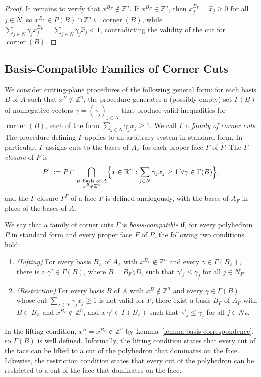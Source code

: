 \documentclass{article}
\newcommand{\Z}{\mathbb{Z}}
\newcommand{\R}{\mathbb{R}}
\begin{document}
\begin{proof}
    It remains to verify that $x^{B_F} \notin \Z^n$. If $x^{B_F} \in \Z^n$, then $x^{B_F}_j = \hat x_j \geq 0$ for all $j \in N$, so $x^{B_F} \in P(B) \cap \Z^n \subseteq \operatorname{corner}(B)$, while $\sum_{j \in N} \gamma_j x^{B_F}_j = \sum_{j \in N} \gamma_j \hat x_j < 1$, contradicting the validity of the cut for $\operatorname{corner}(B)$.
\end{proof}

\subsection{Basis-Compatible Families of Corner Cuts} \label{subsec:corner-hered}

We consider cutting-plane procedures of the following general form: for each basis $B$ of $A$ such that $x^B \notin \Z^n$, the procedure generates a (possibly empty) set $\Gamma(B)$ of nonnegative vectors $\gamma = (\gamma_j)_{j \in N}$ that produce valid inequalities for $\operatorname{corner}(B)$, each of the form $\sum_{j \in N} \gamma_j x_j \geq 1$. We call $\Gamma$ a \emph{family of corner cuts}. The procedure defining $\Gamma$ applies to an arbitrary system in standard form. In particular, $\Gamma$ assigns cuts to the bases of $A_F$ for each proper face $F$ of $P$. The \emph{$\Gamma$-closure} of $P$ is
\begin{align}
    P^\Gamma := P \cap \bigcap_{\substack{B \text{ basis of } A \\ x^B \notin \Z^n}} \Bigl\{x \in \R^n : \sum_{j \in N} \gamma_j x_j \geq 1 \ \forall \gamma \in \Gamma(B)\Bigr\}, \label{eq:gamma-closure}
\end{align}
and the $\Gamma$-closure $F^\Gamma$ of a face $F$ is defined analogously, with the bases of $A_F$ in place of the bases of $A$.

We say that a family of corner cuts $\Gamma$ is \emph{basis-compatible} if, for every polyhedron $P$ in standard form and every proper face $F$ of $P$, the following two conditions hold:
\begin{enumerate}[label=(\roman*)]
    \item \emph{(Lifting)} For every basis $B_F$ of $A_F$ with $x^{B_F} \notin \Z^n$ and every $\gamma \in \Gamma(B_F)$, there is a $\gamma' \in \Gamma(B)$, where $B = B_F \setminus D$, such that $\gamma'_j \leq \gamma_j$ for all $j \in N_F$.
    \item \emph{(Restriction)} For every basis $B$ of $A$ with $x^B \notin \Z^n$ and every $\gamma \in \Gamma(B)$ whose cut $\sum_{j \in N} \gamma_j x_j \geq 1$ is not valid for $F$, there exist a basis $B_F$ of $A_F$ with $B \subset B_F$ and $x^{B_F} \notin \Z^n$, and a $\gamma' \in \Gamma(B_F)$ such that $\gamma'_j \leq \gamma_j$ for all $j \in N_F$.
\end{enumerate}
In the lifting condition, $x^B = x^{B_F} \notin \Z^n$ by Lemma~\ref{lemma:basis-correspondence}, so $\Gamma(B)$ is well defined. Informally, the lifting condition states that every cut of the face can be lifted to a cut of the polyhedron that dominates on the face. Likewise, the restriction condition states that every cut of the polyhedron can be restricted to a cut of the face that dominates on the face.
\end{document}
